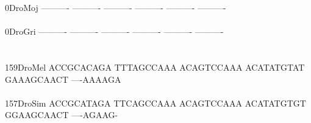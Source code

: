 \documentclass[11pt,twoside,reqno,a4paper]{article}
\begin{document}
{0\hspace*{4\charwidth}DroMoj	----------	----------	----------	----------	----------	----------	\\
\hspace*{5\charwidth}\hspace*{7\charwidth}\hspace*{1\charwidth}\hspace*{1\charwidth}\hspace*{1\charwidth}\hspace*{1\charwidth}\hspace*{1\charwidth}\hspace*{1\charwidth}\\
0\hspace*{4\charwidth}DroGri	----------	----------	----------	----------	----------	----------	\\
\hspace*{5\charwidth}\hspace*{7\charwidth}\hspace*{1\charwidth}\hspace*{1\charwidth}\hspace*{1\charwidth}\hspace*{1\charwidth}\hspace*{1\charwidth}\hspace*{1\charwidth}\\
\\
159\hspace*{2\charwidth}DroMel	ACCGCACAGA	TTTAGCCAAA	ACAGTCCAAA	ACATATGTAT	GAAAGCAACT	----AAAAGA	\\
\hspace*{5\charwidth}\hspace*{7\charwidth}\hspace*{1\charwidth}\hspace*{1\charwidth}\hspace*{1\charwidth}\hspace*{1\charwidth}\hspace*{1\charwidth}\hspace*{1\charwidth}\\
157\hspace*{2\charwidth}DroSim	ACCGCATAGA	TTCAGCCAAA	ACAGTCCAAA	ACATATGTGT	GGAAGCAACT	----AGAAG-	\\
\hspace*{5\charwidth}\hspace*{7\charwidth}\hspace*{1\charwidth}\hspace*{1\charwidth}\hspace*{1\charwidth}\hspace*{1\charwidth}\hspace*{1\charwidth}\hspace*{1\charwidth}\\
}
\end{document}
